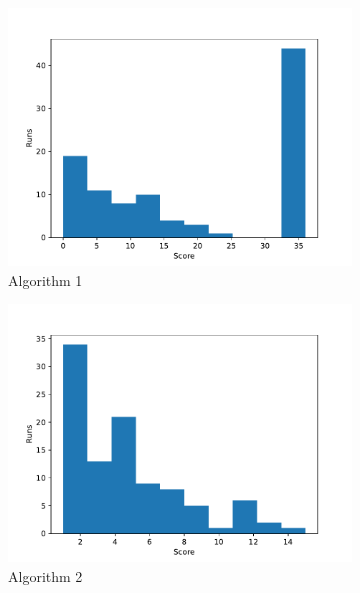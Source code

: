 \documentclass[12pt,a4paper]{article}
\begin{document}
		
		\begin{figure}[h!]
			\begin{subfigure}{.33\textwidth}
				\centering
				\includegraphics[width=\linewidth]{../code/plots/alg1_best_dist}
				\caption{Algorithm 1}
				\label{fig:alg1_best_dist}
			\end{subfigure}
			\begin{subfigure}{.33\textwidth}
				\centering
				\includegraphics[width=\linewidth]{../code/plots/alg2_best_dist}
				\caption{Algorithm 2}
				\label{fig:alg2_best_dist}
			\end{subfigure}
			\begin{subfigure}{.33\textwidth}
				\centering

\end{subfigure}
\end{figure}
\end{document}
